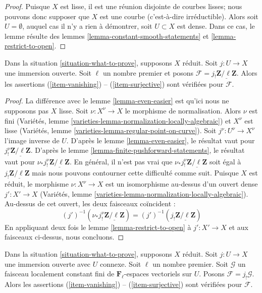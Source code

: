 \begin{proof}
Puisque $X$ est lisse, il est une réunion disjointe de courbes lisses;
nous pouvons donc supposer que $X$ est une courbe (c'est-à-dire irréductible).
Alors soit $U = \emptyset$, auquel cas il n'y a rien à démontrer,
soit $U \subset X$ est dense. Dans ce cas, le lemme résulte des
lemmes \ref{lemma-constant-smooth-statements} et
\ref{lemma-restrict-to-open}.
\end{proof}

\begin{lemma}
\label{lemma-somewhat-easier}
Dans la situation \ref{situation-what-to-prove}, supposons $X$ réduit.
Soit $j : U \to X$ une immersion ouverte. Soit $\ell$ un nombre premier
et posons $\mathcal{F} = j_!\underline{\mathbf{Z}/\ell\mathbf{Z}}$.
Alors les assertions (\ref{item-vanishing}) -- (\ref{item-surjective}) sont vérifiées
pour $\mathcal{F}$.
\end{lemma}

\begin{proof}
La différence avec le lemme \ref{lemma-even-easier} est qu'ici nous ne
supposons pas $X$ lisse. Soit $\nu : X^\nu \to X$ le morphisme de
normalisation. Alors $\nu$ est fini
(Variétés, lemme \ref{varieties-lemma-normalization-locally-algebraic})
et $X^\nu$ est lisse
(Variétés, lemme \ref{varieties-lemma-regular-point-on-curve}).
Soit $j^\nu : U^\nu \to X^\nu$ l'image inverse de $U$.
D'après le lemme \ref{lemma-even-easier}, le résultat vaut pour
$j^\nu_!\underline{\mathbf{Z}/\ell\mathbf{Z}}$.
D'après le lemme \ref{lemma-finite-pushforward-statements},
le résultat vaut pour $\nu_*j^\nu_!\underline{\mathbf{Z}/\ell\mathbf{Z}}$.
En général, il n'est pas vrai que
$\nu_*j^\nu_!\underline{\mathbf{Z}/\ell\mathbf{Z}}$ soit égal à
$j_!\underline{\mathbf{Z}/\ell\mathbf{Z}}$
mais nous pouvons contourner cette difficulté comme suit.
Puisque $X$ est réduit, le morphisme $\nu : X^\nu \to X$
est un isomorphisme au-dessus d'un ouvert dense $j' : X' \to X$
(Variétés, lemme \ref{varieties-lemma-normalization-locally-algebraic}).
Au-dessus de cet ouvert, les deux faisceaux coïncident :
$$
(j')^{-1}(\nu_*j^\nu_!\underline{\mathbf{Z}/\ell\mathbf{Z}})
=
(j')^{-1}(j_!\underline{\mathbf{Z}/\ell\mathbf{Z}})
$$
En appliquant deux fois le lemme \ref{lemma-restrict-to-open}
à $j' : X' \to X$ et aux faisceaux ci-dessus,
nous concluons.
\end{proof}

\begin{lemma}
\label{lemma-vanishing-easier}
Dans la situation \ref{situation-what-to-prove}, supposons $X$ réduit.
Soit $j : U \to X$ une immersion ouverte avec $U$ connexe. Soit
$\ell$ un nombre premier. Soit $\mathcal{G}$ un faisceau localement constant
fini de $\mathbf{F}_\ell$-espaces vectoriels sur $U$. Posons
$\mathcal{F} = j_!\mathcal{G}$. Alors les assertions
(\ref{item-vanishing}) -- (\ref{item-surjective}) sont vérifiées pour $\mathcal{F}$.
\end{lemma}

